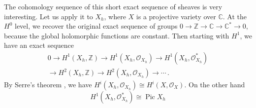 {The cohomology sequence of this short exact sequence of sheaves is very interesting. Let us apply it to $X_h$, where $X$ is a projective variety over $\mathbb C$. At the $H^0$ level, we recover the original exact sequence of groups $0\to\mathbb Z\to\mathbb C\to\mathbb C^*\to0$, because the global holomorphic functions are constant. Then starting with $H^1$, we have an exact sequence
\[
\begin{gathered}
0\to H^1(X_h,\mathbb Z)\to H^1(X_h,\mathcal O_{X_h})\to H^1(X_h,\mathcal O_{X_h}^*)\\
\to H^2(X_h,\mathbb Z)\to H^2(X_h,\mathcal O_{X_h})\to\cdots\,.
\end{gathered}
\]
By Serre's theorem , we have $H^i(X_h,\mathcal O_{X_h})\cong H^i(X,\mathcal O_X)$. On the other hand
\[
H^1(X_h,\mathcal O_{X_h}^*)\cong\operatorname{Pic}X_h
\]
}
